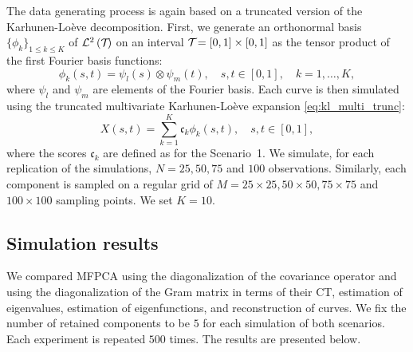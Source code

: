 \begin{scenario}
The data generating process is again based on a truncated version of the Karhunen-Loève decomposition. First, we generate an orthonormal basis $\{\phi_k\}_{1 \leq k \leq K}$ of $\mathcal{L}^{2}\left(\mathcal{T}_{}\right)$ on an interval $\mathcal{T}_{} = [0, 1] \times [0, 1]$ as the tensor product of the first Fourier basis functions:
\begin{equation}
    \phi_k(s, t) = \psi_l(s) \otimes \psi_m(t), \quad s, t \in [0, 1],\quad k = 1, \dots, K,
\end{equation}
where $\psi_l$ and $\psi_m$ are elements of the Fourier basis.
Each curve is then simulated using the truncated multivariate Karhunen-Loève expansion \eqref{eq:kl_multi_trunc}:
\begin{equation}
    X(s, t) = \sum_{k = 1}^K \mathfrak{c}_k \phi_k(s, t), \quad s, t \in [0, 1],
\end{equation}
where the scores $\mathfrak{c}_k$ are defined as for the Scenario~1. We simulate, for each replication of the simulations, $N = 25, 50, 75$ and $100$ observations. Similarly, each component is sampled on a regular grid of $M = 25 \times 25, 50 \times 50, 75 \times 75$ and $100 \times 100$ sampling points. We set $K = 10$.
\end{scenario}


\subsection{Simulation results} %
\label{sub:simulation_results}

We compared MFPCA using the diagonalization of the covariance operator and using the diagonalization of the Gram matrix in terms of their CT, estimation of eigenvalues, estimation of eigenfunctions, and reconstruction of curves. We fix the number of retained components to be $5$ for each simulation of both scenarios. Each experiment is repeated $500$ times. The results are presented below.

